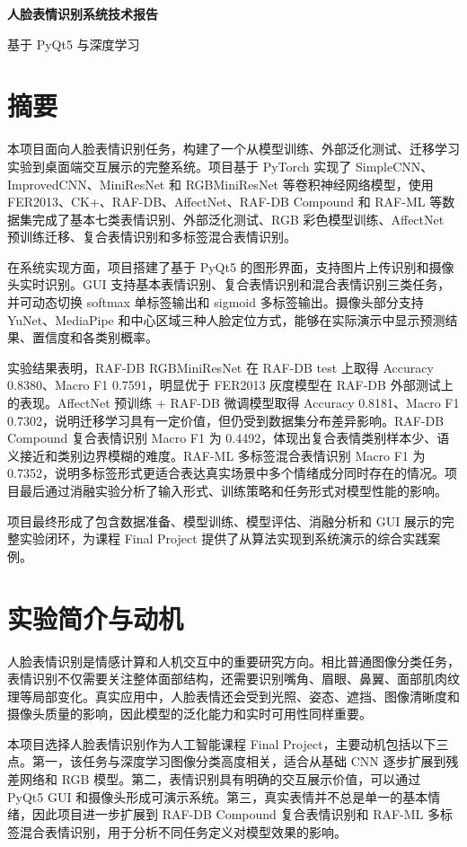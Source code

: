 \documentclass[UTF8,a4paper,12pt]{ctexart}
\newcommand{\makecover}{
  \begin{titlepage}
    \thispagestyle{empty}
    \begin{center}
      \vspace*{3cm}
      {\LARGE\bfseries 人脸表情识别系统技术报告\par}
      \vspace*{1cm}
      {\Large 基于 PyQt5 与深度学习\par}
      \vspace*{2cm}
      {\large \par}
    \end{center}
  \end{titlepage}
}
\begin{document}
\makecover
\tableofcontents
\newpage

\section{摘要}

本项目面向人脸表情识别任务，构建了一个从模型训练、外部泛化测试、迁移学习实验到桌面端交互展示的完整系统。项目基于 PyTorch 实现了 SimpleCNN、ImprovedCNN、MiniResNet 和 RGBMiniResNet 等卷积神经网络模型，使用 FER2013、CK+、RAF-DB、AffectNet、RAF-DB Compound 和 RAF-ML 等数据集完成了基本七类表情识别、外部泛化测试、RGB 彩色模型训练、AffectNet 预训练迁移、复合表情识别和多标签混合表情识别。

在系统实现方面，项目搭建了基于 PyQt5 的图形界面，支持图片上传识别和摄像头实时识别。GUI 支持基本表情识别、复合表情识别和混合表情识别三类任务，并可动态切换 softmax 单标签输出和 sigmoid 多标签输出。摄像头部分支持 YuNet、MediaPipe 和中心区域三种人脸定位方式，能够在实际演示中显示预测结果、置信度和各类别概率。

实验结果表明，RAF-DB RGBMiniResNet 在 RAF-DB test 上取得 Accuracy 0.8380、Macro F1 0.7591，明显优于 FER2013 灰度模型在 RAF-DB 外部测试上的表现。AffectNet 预训练 + RAF-DB 微调模型取得 Accuracy 0.8181、Macro F1 0.7302，说明迁移学习具有一定价值，但仍受到数据集分布差异影响。RAF-DB Compound 复合表情识别 Macro F1 为 0.4492，体现出复合表情类别样本少、语义接近和类别边界模糊的难度。RAF-ML 多标签混合表情识别 Macro F1 为 0.7352，说明多标签形式更适合表达真实场景中多个情绪成分同时存在的情况。项目最后通过消融实验分析了输入形式、训练策略和任务形式对模型性能的影响。

项目最终形成了包含数据准备、模型训练、模型评估、消融分析和 GUI 展示的完整实验闭环，为课程 Final Project 提供了从算法实现到系统演示的综合实践案例。

\section{实验简介与动机}

人脸表情识别是情感计算和人机交互中的重要研究方向。相比普通图像分类任务，表情识别不仅需要关注整体面部结构，还需要识别嘴角、眉眼、鼻翼、面部肌肉纹理等局部变化。真实应用中，人脸表情还会受到光照、姿态、遮挡、图像清晰度和摄像头质量的影响，因此模型的泛化能力和实时可用性同样重要。

本项目选择人脸表情识别作为人工智能课程 Final Project，主要动机包括以下三点。第一，该任务与深度学习图像分类高度相关，适合从基础 CNN 逐步扩展到残差网络和 RGB 模型。第二，表情识别具有明确的交互展示价值，可以通过 PyQt5 GUI 和摄像头形成可演示系统。第三，真实表情并不总是单一的基本情绪，因此项目进一步扩展到 RAF-DB Compound 复合表情识别和 RAF-ML 多标签混合表情识别，用于分析不同任务定义对模型效果的影响。
\end{document}
